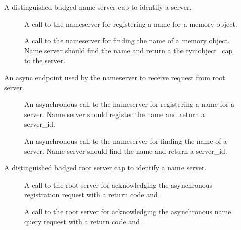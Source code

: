 \begin{description}
\item[] A distinguished badged name
  server cap to identify a server.
  \begin{description}
  \item[] A call to
    the nameserver for registering a name for a memory object.
  \item[] A call to the
    nameserver for finding the name of a memory object. Name server
    should find the name and return a the ty{mobject\_cap} to the
    server.
  \end{description}


\item[] An async endpoint used by the
  nameserver to receive request from root server.
  \begin{description}
  \item[] An asynchronous call to
    the nameserver for registering a name for a server. Name server
    should register the name and return a server\_id.
  \item[] An asynchronous call to the
    nameserver for finding the name of a server. Name server should
    find the name and return a server\_id.
  \end{description}
  
\item[] A distinguished badged root
  server cap to identify a name server.
  \begin{description}
  \item[] A call to the
    root server for acknowledging the asynchronous registration
    request with a return code and .
  \item[] A call to the
    root server for acknowledging the asynchronous name query request
    with a return code and .
  \end{description}
\end{description}



